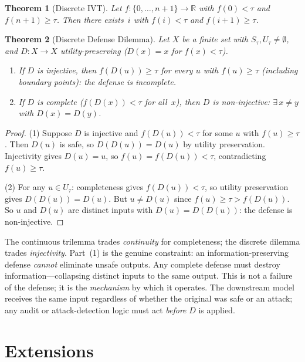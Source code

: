 \documentclass{article}
\newtheorem{theorem}{Theorem}[section]
\newcommand{\R}{\mathbb{R}}
\begin{document}
\begin{theorem}[Discrete IVT]
\label{thm:disc-ivt}
Let $f\colon \{0,\ldots,n+1\} \to \R$ with $f(0) < \tau$ and
$f(n+1) \geq \tau$. Then there exists~$i$ with $f(i) < \tau$ and
$f(i+1) \geq \tau$.
\end{theorem}

\begin{theorem}[Discrete Defense Dilemma]
\label{thm:disc-dilemma}
Let $X$ be a finite set with $S_\tau, U_\tau \neq \emptyset$, and
$D\colon X \to X$ utility-preserving ($D(x) = x$ for $f(x) < \tau$).
\begin{enumerate}[nosep]
  \item If $D$ is injective, then $f(D(u)) \geq \tau$ for every
    $u$ with $f(u) \geq \tau$ (including boundary points): the
    defense is incomplete.
  \item If $D$ is complete ($f(D(x)) < \tau$ for all~$x$), then $D$ is
    non-injective: $\exists\, x \neq y$ with $D(x) = D(y)$.
\end{enumerate}
\end{theorem}

\begin{proof}
(1) Suppose $D$ is injective and $f(D(u)) < \tau$ for some $u$ with
$f(u) \geq \tau$. Then $D(u)$ is safe, so $D(D(u)) = D(u)$ by utility
preservation. Injectivity gives $D(u) = u$, so
$f(u) = f(D(u)) < \tau$, contradicting $f(u) \geq \tau$.

(2) For any $u \in U_\tau$: completeness gives $f(D(u)) < \tau$, so
utility preservation gives $D(D(u)) = D(u)$. But
$u \neq D(u)$ since $f(u) \geq \tau > f(D(u))$.
So $u$ and $D(u)$ are distinct inputs with $D(u) = D(D(u))$: the
defense is non-injective.
\end{proof}

The continuous trilemma trades \emph{continuity} for completeness;
the discrete dilemma trades \emph{injectivity}. Part~(1) is the
genuine constraint: an information-preserving defense \emph{cannot}
eliminate unsafe outputs. Any complete defense must destroy
information---collapsing distinct inputs to the same output. This is
not a failure of the defense; it is the \emph{mechanism} by which it
operates. The downstream model receives the same input regardless
of whether the original was safe or an attack; any audit or
attack-detection logic must act \emph{before} $D$ is applied.


\section{Extensions}
\label{sec:extensions}
\end{document}
